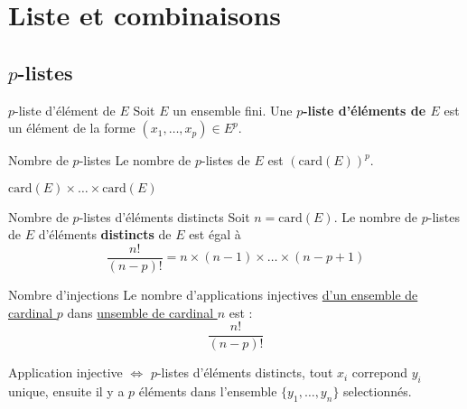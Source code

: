 




\section{Liste et combinaisons} %
\label{sec:Liste et combinaisons}

\subsection{$p$-listes} %
\label{sub:p-listes}

\begin{Definition}[colbacktitle=red!75!black]{$p$-liste d'élément de $E$}{}
Soit $E$ un ensemble fini. Une \textbf{$p$-liste d'éléments de $E$} est un élément de la forme $(x_1, \dots,x_p) \in E ^{p}$.
\end{Definition}

\begin{Theorem}{Nombre de $p$-listes}{}
Le nombre de $p$-listes de $E$ est $(\mathrm{card}(E)) ^{p}$. 
\end{Theorem}

\begin{myproof}{}{}
  $\mathrm{card}(E) \times \dots \times \mathrm{card}(E)$
\end{myproof}

\begin{Theorem}{Nombre de $p$-listes d'éléments distincts}{}
Soit $n = \mathrm{card}(E)$. Le nombre de $p$-listes de $E$ d'éléments \textbf{distincts} de $E$ est égal à 
\begin{equation}
  \frac{n!}{(n-p)!} = n \times (n-1) \times \dots \times (n-p+1)
\end{equation}
\end{Theorem}

\begin{Theorem}{Nombre d'injections}{}
Le nombre d'applications injectives \underline{d'un ensemble de cardinal $p$} dans \underline{unsemble de cardinal $n$} est : 
\begin{equation}
  \frac{n!}{(n-p)!} 
\end{equation}
\end{Theorem}

\begin{note}{}{}
  Application injective $\iff$ $p$-listes d'éléments distincts, tout $x_i$ correpond $y_i$ unique, ensuite il y a $p$ éléments dans l'ensemble $\{y_1, \dots, y_n\}$ selectionnés.
\end{note}















